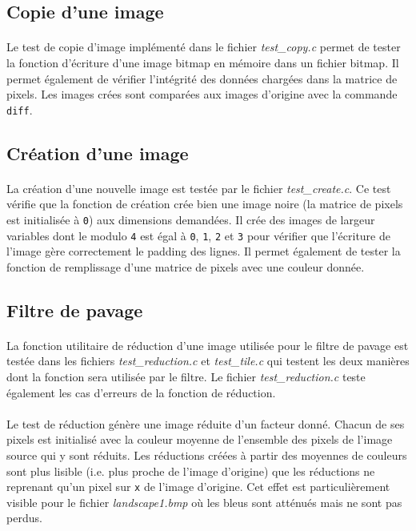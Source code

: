 \documentclass{article}
\begin{document}
    \subsection{Copie d'une image}
    \paragraph{}
    Le test de copie d'image implémenté dans le fichier \emph{test\_copy.c} permet de tester la fonction d'écriture d'une image bitmap en mémoire dans un fichier bitmap. Il permet également de vérifier l'intégrité des données chargées dans la matrice de pixels. Les images crées sont comparées aux images d'origine avec la commande \texttt{diff}.


    \subsection{Création d'une image}
    \paragraph{}
    La création d'une nouvelle image est testée par le fichier \emph{test\_create.c}. Ce test vérifie que la fonction de création crée bien une image noire (la matrice de pixels est initialisée à \texttt{0}) aux dimensions demandées. Il crée des images de largeur variables dont le modulo \texttt{4} est égal à \texttt{0}, \texttt{1}, \texttt{2} et \texttt{3} pour vérifier que l'écriture de l'image gère correctement le padding des lignes. Il permet également de tester la fonction de remplissage d'une matrice de pixels avec une couleur donnée.

    \subsection{Filtre de pavage}
    \paragraph{}
    La fonction utilitaire de réduction d'une image utilisée pour le filtre de pavage est testée dans les fichiers \emph{test\_reduction.c} et \emph{test\_tile.c} qui testent les deux manières dont la fonction sera utilisée par le filtre. Le fichier \emph{test\_reduction.c} teste également les cas d'erreurs de la fonction de réduction.

    \paragraph{}
    Le test de réduction génère une image réduite d'un facteur donné. Chacun de ses pixels est initialisé avec la couleur moyenne de l'ensemble des pixels de l'image source qui y sont réduits. Les réductions créées à partir des moyennes de couleurs sont plus lisible (i.e. plus proche de l'image d'origine) que les réductions ne reprenant qu'un pixel sur \texttt{x} de l'image d'origine. Cet effet est particulièrement visible pour le fichier \emph{landscape1.bmp} où les bleus sont atténués mais ne sont pas perdus.
\end{document}
